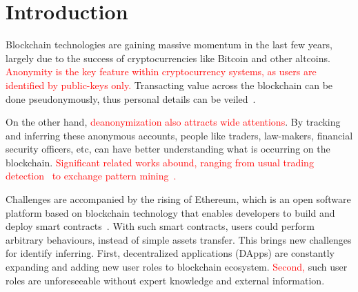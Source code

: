 \section{Introduction}
Blockchain technologies are gaining massive momentum in the last few years, largely due to the success of cryptocurrencies like Bitcoin and other altcoins. \textcolor{red}{Anonymity is the key feature within cryptocurrency systems, as users are identified by public-keys only.} Transacting value across the blockchain can be done pseudonymously, thus personal details can be veiled~\cite{reid2013analysis}.

On the other hand, \textcolor{red}{deanonymization also attracts wide attentions}. By tracking and inferring these anonymous accounts, people like traders, law-makers, financial security officers, etc, can have better understanding what is occurring on the blockchain. \textcolor{red}{Significant related works abound, ranging from usual trading detection~\cite{maesa2016analysis} to exchange pattern mining~\cite{ranshous2017exchange}.}


Challenges are accompanied by the rising of Ethereum, which is an open software platform based on blockchain technology that enables developers to build and deploy smart contracts~\cite{buterin2013ethereum}.
With such smart contracts, users could perform arbitrary behaviours, instead of simple assets transfer. This brings new challenges for identify inferring. First, decentralized applications (DApps) are constantly expanding and adding new user roles to blockchain ecosystem. \textcolor{red}{Second,} such user roles are unforeseeable without expert knowledge and external information.

